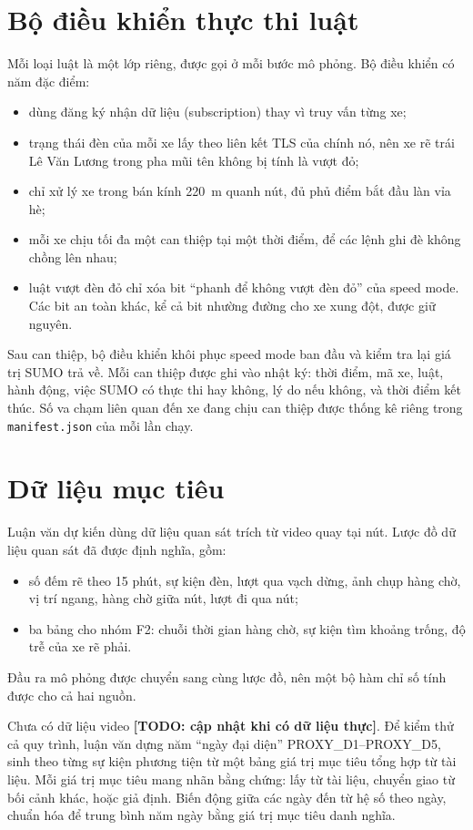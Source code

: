 \documentclass[../DoAn.tex]{subfiles}
\begin{document}
\section{Bộ điều khiển thực thi luật}
\label{section:3.5}

Mỗi loại luật là một lớp riêng, được gọi ở mỗi bước mô phỏng. Bộ điều khiển có năm đặc điểm:
\begin{itemize}
    \item dùng đăng ký nhận dữ liệu (subscription) thay vì truy vấn từng xe;
    \item trạng thái đèn của mỗi xe lấy theo liên kết TLS của chính nó, nên xe rẽ trái Lê Văn Lương trong pha mũi tên không bị tính là vượt đỏ;
    \item chỉ xử lý xe trong bán kính 220~m quanh nút, đủ phủ điểm bắt đầu làn vỉa hè;
    \item mỗi xe chịu tối đa một can thiệp tại một thời điểm, để các lệnh ghi đè không chồng lên nhau;
    \item luật vượt đèn đỏ chỉ xóa bit ``phanh để không vượt đèn đỏ'' của speed mode. Các bit an toàn khác, kể cả bit nhường đường cho xe xung đột, được giữ nguyên.
\end{itemize}
Sau can thiệp, bộ điều khiển khôi phục speed mode ban đầu và kiểm tra lại giá trị SUMO trả về. Mỗi can thiệp được ghi vào nhật ký: thời điểm, mã xe, luật, hành động, việc SUMO có thực thi hay không, lý do nếu không, và thời điểm kết thúc. Số va chạm liên quan đến xe đang chịu can thiệp được thống kê riêng trong \texttt{manifest.json} của mỗi lần chạy.

\section{Dữ liệu mục tiêu}
\label{section:3.6}

Luận văn dự kiến dùng dữ liệu quan sát trích từ video quay tại nút. Lược đồ dữ liệu quan sát đã được định nghĩa, gồm:
\begin{itemize}
    \item số đếm rẽ theo 15 phút, sự kiện đèn, lượt qua vạch dừng, ảnh chụp hàng chờ, vị trí ngang, hàng chờ giữa nút, lượt đi qua nút;
    \item ba bảng cho nhóm F2: chuỗi thời gian hàng chờ, sự kiện tìm khoảng trống, độ trễ của xe rẽ phải.
\end{itemize}
Đầu ra mô phỏng được chuyển sang cùng lược đồ, nên một bộ hàm chỉ số tính được cho cả hai nguồn.

\begin{sloppypar}
Chưa có dữ liệu video \textbf{[TODO: cập nhật khi có dữ liệu thực]}. Để kiểm thử cả quy trình, luận văn dựng năm ``ngày đại diện'' PROXY\_D1--PROXY\_D5, sinh theo từng sự kiện phương tiện từ một bảng giá trị mục tiêu tổng hợp từ tài liệu. Mỗi giá trị mục tiêu mang nhãn bằng chứng: lấy từ tài liệu, chuyển giao từ bối cảnh khác, hoặc giả định. Biến động giữa các ngày đến từ hệ số theo ngày, chuẩn hóa để trung bình năm ngày bằng giá trị mục tiêu danh nghĩa.
\end{sloppypar}
\end{document}
